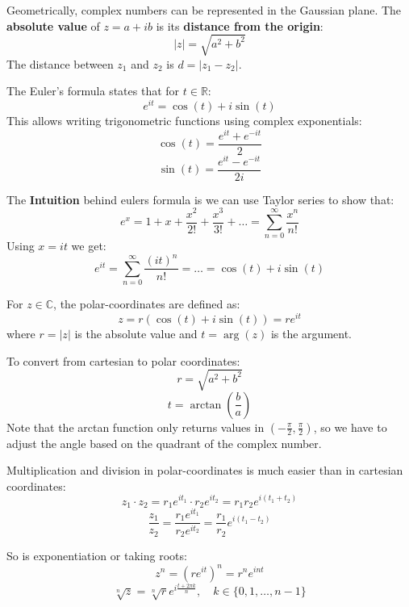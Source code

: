 \begin{definition}
    Geometrically, complex numbers can be represented in the Gaussian plane. The \textbf{absolute value} of $z = a + ib$ is its \textbf{distance from the origin}:
    $$|z| = \sqrt{a^2 + b^2}$$
    The distance between $z_1$ and $z_2$ is $d = |z_1 - z_2|$. 
\end{definition}

\begin{theorem}
    The Euler's formula states that for $t \in \mathbb{R}$:
    $$e^{it} = \cos(t) + i\sin(t)$$
    This allows writing trigonometric functions using complex exponentials:
    $$\cos(t) = \frac{e^{it} + e^{-it}}{2}$$
    $$\sin(t) = \frac{e^{it} - e^{-it}}{2i}$$
\end{theorem}

\begin{remark}
    The \textbf{Intuition} behind eulers formula is we can use Taylor series to show that:
    $$e^x = 1 + x + \frac{x^2}{2!} + \frac{x^3}{3!} + \dots = \sum_{n=0}^\infty \frac{x^n}{n!}$$
    Using $x=it$ we get:
    $$e^{it} = \sum_{n=0}^\infty \frac{(it)^n}{n!} = \dots = \cos(t) + i\sin(t)$$
\end{remark}

\begin{definition}
    For $z \in \mathbb{C}$, the polar-coordinates are defined as:
    $$z = r(\cos(t) + i\sin(t)) = r e^{it}$$
    where $r = |z|$ is the absolute value and $t = \arg(z)$ is the argument.
\end{definition}

\begin{remark}
    To convert from cartesian to polar coordinates:
    $$r = \sqrt{a^2 + b^2}$$
    $$t = \arctan\left(\frac{b}{a}\right)$$
    Note that the arctan function only returns values in $(-\frac{\pi}{2}, \frac{\pi}{2})$, so we have to adjust the angle based on the quadrant of the complex number.
\end{remark}

\begin{example}
    Multiplication and division in polar-coordinates is much easier than in cartesian coordinates:
    $$z_1 \cdot z_2 = r_1 e^{it_1} \cdot r_2 e^{it_2} = r_1 r_2 e^{i(t_1 + t_2)}$$
    $$\frac{z_1}{z_2} = \frac{r_1 e^{it_1}}{r_2 e^{it_2}} = \frac{r_1}{r_2} e^{i(t_1 - t_2)}$$
\end{example}

\begin{example}
    So is exponentiation or taking roots:
    $$z^n = (r e^{it})^n = r^n e^{int}$$
    $$\sqrt[n]{z} = \sqrt[n]{r} e^{i\frac{t+2\pi k}{n}}, \quad k \in \{0, 1, \dots, n-1\}$$
\end{example}

